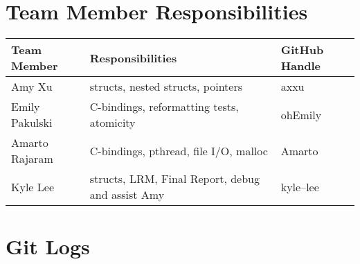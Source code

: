 \section{Team Member Responsibilities}
  

  \begin{tabular}{ | l | l | l |}\hline
    Team Member  & Responsibilities      & GitHub Handle\\ \hline
    Amy Xu & structs, nested structs, pointers & axxu\\
    Emily Pakulski & C-bindings, reformatting tests, atomicity & ohEmily\\
    Amarto Rajaram & C-bindings, pthread, file I/O, malloc & Amarto\\
    Kyle Lee & structs, LRM, Final Report, debug and assist Amy & kyle--lee\\ \hline
  \end{tabular}

\section{Git Logs}
